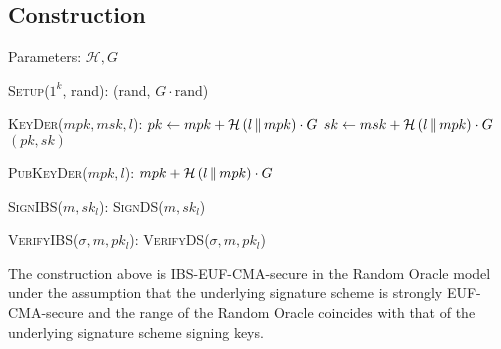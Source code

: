   \subsection{Construction}
    Parameters: $\mathcal{H}, G$
    \begin{algorithmic}[0]
      \State \textsc{Setup}($1^k$, rand):
      \Indent
        \State \Return (rand, $G \cdot \mathrm{rand}$)
      \EndIndent
    \end{algorithmic}

    \begin{algorithmic}[0]
      \State \textsc{KeyDer}($mpk, msk, l$):
      \Indent
        \State $pk \gets mpk + \mathcal{H}\left(l \,\|\, mpk\right) \cdot G$
        \State $sk \gets msk + \mathcal{H}\left(l \,\|\, mpk\right) \cdot G$
        \State \Return $(pk, sk)$
      \EndIndent
    \end{algorithmic}

    \begin{algorithmic}[0]
      \State \textsc{PubKeyDer}($mpk, l$):
      \Indent
        \State \Return $mpk + \mathcal{H}\left(l \,\|\, mpk\right) \cdot G$
      \EndIndent
    \end{algorithmic}

    \begin{algorithmic}[0]
      \State \textsc{SignIBS}($m, sk_l$):
      \Indent
        \State \Return \textsc{SignDS}($m, sk_l$)
      \EndIndent
    \end{algorithmic}

    \begin{algorithmic}[0]
      \State \textsc{VerifyIBS}($\sigma, m, pk_l$):
      \Indent
        \State \Return \textsc{VerifyDS}($\sigma, m, pk_l$)
      \EndIndent
    \end{algorithmic}

    \begin{theorem}
      \label{theorem:ibs}
      The construction above is \textsf{IBS-EUF-CMA}-secure in the Random Oracle
      model under the assumption that the underlying signature scheme is
      strongly \textsf{EUF-CMA}-secure and the range of the Random Oracle
      coincides with that of the underlying signature scheme signing keys.
    \end{theorem}
